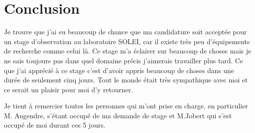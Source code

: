 





			
	\chapter*{Conclusion}
		
       Je trouve que j'ai eu beaucoup de chance que ma candidature soit acceptée pour un stage d'observation au laboratoire SOLEI, car il existe très peu d'équipements de recherche comme celui là. Ce stage m'a éclairer sur beaucoup de choses mais je ne sais toujours pas dans quel domaine précis j'aimerais travailler plus tard. Ce que j'ai apprécié à ce stage c'est d'avoir appris beaucoup de choses dans une durée de seulement cinq jours.
       Tout le monde était très sympathique avec moi et ce serait un plaisir pour moi d'y retourner.

       Je tient à remercier toutes les personnes qui m'ont prise en charge, en particulier M. Augendre, s'étant occupé de ma demande de stage et M.Jobert qui s'est occupé de moi durant ces 5 jours.
